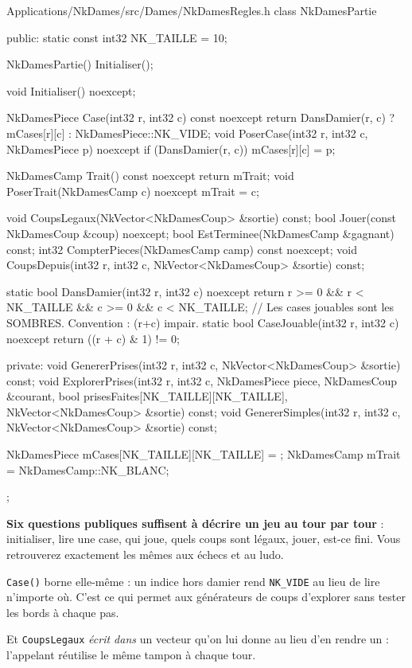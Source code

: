 \begin{nkcode}{Applications/NkDames/src/Dames/NkDamesRegles.h}
        class NkDamesPartie {
            public:
                static const int32 NK_TAILLE = 10;

                NkDamesPartie() { Initialiser(); }

                void Initialiser() noexcept;

                NkDamesPiece Case(int32 r, int32 c) const noexcept {
                    return DansDamier(r, c) ? mCases[r][c] : NkDamesPiece::NK_VIDE;
                }
                void PoserCase(int32 r, int32 c, NkDamesPiece p) noexcept {
                    if (DansDamier(r, c)) { mCases[r][c] = p; }
                }

                NkDamesCamp Trait() const noexcept { return mTrait; }
                void PoserTrait(NkDamesCamp c) noexcept { mTrait = c; }

                void CoupsLegaux(NkVector<NkDamesCoup> &sortie) const;
                bool Jouer(const NkDamesCoup &coup) noexcept;
                bool EstTerminee(NkDamesCamp &gagnant) const;
                int32 CompterPieces(NkDamesCamp camp) const noexcept;
                void CoupsDepuis(int32 r, int32 c, NkVector<NkDamesCoup> &sortie) const;

                static bool DansDamier(int32 r, int32 c) noexcept {
                    return r >= 0 && r < NK_TAILLE && c >= 0 && c < NK_TAILLE;
                }
                // Les cases jouables sont les SOMBRES. Convention : (r+c) impair.
                static bool CaseJouable(int32 r, int32 c) noexcept {
                    return ((r + c) & 1) != 0;
                }

            private:
                void GenererPrises(int32 r, int32 c, NkVector<NkDamesCoup> &sortie) const;
                void ExplorerPrises(int32 r, int32 c, NkDamesPiece piece, NkDamesCoup &courant,
                                    bool prisesFaites[NK_TAILLE][NK_TAILLE],
                                    NkVector<NkDamesCoup> &sortie) const;
                void GenererSimples(int32 r, int32 c, NkVector<NkDamesCoup> &sortie) const;

                NkDamesPiece mCases[NK_TAILLE][NK_TAILLE] = {};
                NkDamesCamp mTrait = NkDamesCamp::NK_BLANC;
        };
\end{nkcode}

\begin{nkretenir}
\textbf{Six questions publiques suffisent à décrire un jeu au tour par tour} :
initialiser, lire une case, qui joue, quels coups sont légaux, jouer, est-ce
fini. Vous retrouverez exactement les mêmes aux échecs et au ludo.

\texttt{Case()} borne elle-même : un indice hors damier rend \texttt{NK\_VIDE}
au lieu de lire n'importe où. C'est ce qui permet aux générateurs de coups
d'explorer sans tester les bords à chaque pas.

Et \texttt{CoupsLegaux} \emph{écrit dans} un vecteur qu'on lui donne au lieu
d'en rendre un : l'appelant réutilise le même tampon à chaque tour.
\end{nkretenir}

